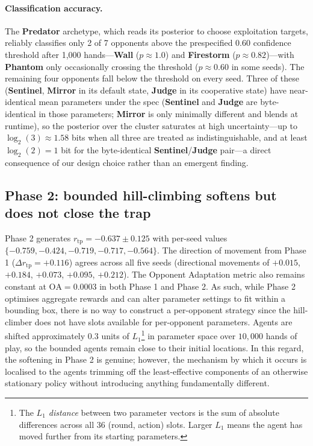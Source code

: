 \documentclass[10pt,twocolumn,letterpaper]{article}
\newcommand{\arch}[1]{\textbf{#1}}
\newcommand{\rtp}{\ensuremath{r_{\mathrm{tp}}}}
\begin{document}
\paragraph{Classification accuracy.}
The \arch{Predator} archetype, which reads its posterior to
choose exploitation targets, reliably classifies only 2 of 7
opponents above the prespecified 0.60 confidence threshold after
1{,}000 hands---\arch{Wall} ($p \approx 1.0$) and \arch{Firestorm}
($p \approx 0.82$)---with \arch{Phantom} only occasionally crossing
the threshold ($p \approx 0.60$ in some seeds). The remaining four opponents
fall below the threshold on every seed. Three of these
(\arch{Sentinel}, \arch{Mirror} in its default state,
\arch{Judge} in its cooperative state) have near-identical mean
parameters under the spec (\arch{Sentinel} and \arch{Judge} are
byte-identical in those parameters; \arch{Mirror} is only minimally
different and blends at runtime), so the posterior over the cluster saturates at high
uncertainty---up to $\log_2(3) \approx 1.58$ bits when all three are
treated as indistinguishable, and at least $\log_2(2) = 1$ bit for
the byte-identical \arch{Sentinel}/\arch{Judge} pair---a direct
consequence of our design choice rather than an emergent finding.


\subsection{Phase 2: bounded hill-climbing softens but does not
close the trap}

Phase 2 generates $\rtp = -0.637 \pm 0.125$ with per-seed values
$\{-0.759, -0.424, -0.719, -0.717, -0.564\}$. The direction of
movement from Phase 1 ($\Delta\rtp = +0.116$) agrees across all five
seeds (directional movements of $+0.015$, $+0.184$, $+0.073$,
$+0.095$, $+0.212$). The Opponent Adaptation metric also remains
constant at $\mathrm{OA} = 0.0003$ in both Phase 1 and Phase 2. As
such, while Phase 2 optimises aggregate rewards and can alter
parameter settings to fit within a bounding box, there is no way to
construct a per-opponent strategy since the hill-climber does not
have slots available for per-opponent parameters. Agents are shifted
approximately $0.3$ units of $L_1$\footnote{The \textit{$L_1$
distance} between two parameter vectors is the sum of absolute
differences across all 36 (round, action) slots. Larger $L_1$ means
the agent has moved further from its starting parameters.} in
parameter space over $10{,}000$ hands of play, so the bounded agents
remain close to their initial locations. In this regard, the
softening in Phase 2 is genuine; however, the mechanism by which it
occurs is localised to the agents trimming off the least-effective
components of an otherwise stationary policy without introducing
anything fundamentally different.
\end{document}
